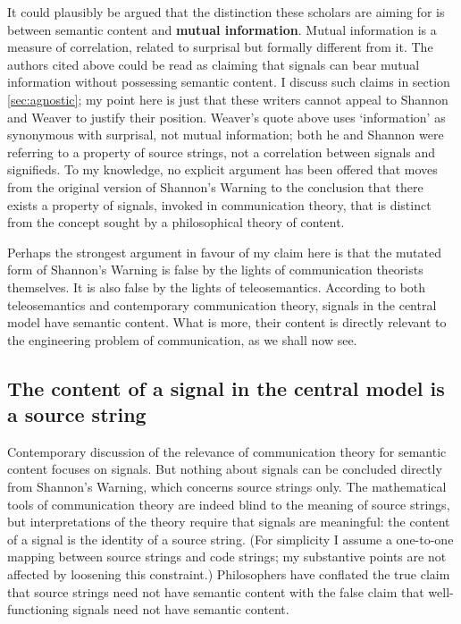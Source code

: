 \documentclass[12pt]{article}
\begin{document}
It could plausibly be argued that the distinction these scholars are aiming for is between semantic content and \textbf{mutual information}.
Mutual information is a measure of correlation, related to surprisal but formally different from it.
The authors cited above could be read as claiming that signals can bear mutual information without possessing semantic content.
I discuss such claims in section \ref{sec:agnostic}; my point here is just that these writers cannot appeal to Shannon and Weaver to justify their position.
Weaver's quote above uses `information' as synonymous with surprisal, not mutual information; both he and Shannon were referring to a property of source strings, not a correlation between signals and signifieds.
To my knowledge, no explicit argument has been offered that moves from the original version of {\sc Shannon's Warning} to the conclusion that there exists a property of signals, invoked in communication theory, that is distinct from the concept sought by a philosophical theory of content.

Perhaps the strongest argument in favour of my claim here is that the mutated form of {\sc Shannon's Warning} is false by the lights of communication theorists themselves.
It is also false by the lights of teleosemantics.
According to both teleosemantics and contemporary communication theory, signals in the central model have semantic content.
What is more, their content is directly relevant to the engineering problem of communication, as we shall now see.


\subsection{The content of a signal in the central model is a source string}\label{subsec:signalContent}

Contemporary discussion of the relevance of communication theory for semantic content focuses on signals.
But nothing about signals can be concluded directly from {\sc Shannon's Warning}, which concerns source strings only.
The mathematical tools of communication theory are indeed blind to the meaning of source strings, but interpretations of the theory require that signals are meaningful: the content of a signal is the identity of a source string.
(For simplicity I assume a one-to-one mapping between source strings and code strings; my substantive points are not affected by loosening this constraint.)
Philosophers have conflated the true claim that source strings need not have semantic content with the false claim that well-functioning signals need not have semantic content.
\end{document}
